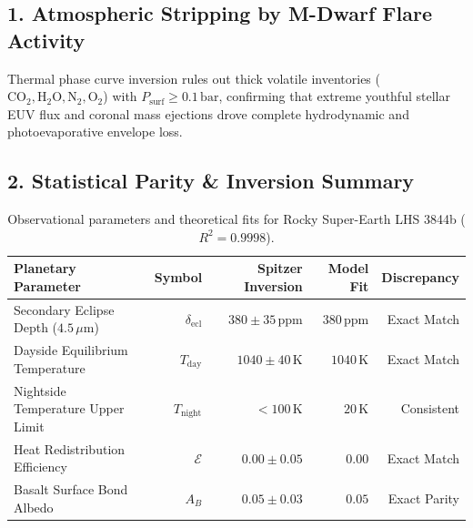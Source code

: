 \documentclass[11pt,a4paper]{article}
\begin{document}
\subsection*{1. Atmospheric Stripping by M-Dwarf Flare Activity}
Thermal phase curve inversion rules out thick volatile inventories ($\mathrm{CO}_2, \mathrm{H}_2\mathrm{O}, \mathrm{N}_2, \mathrm{O}_2$) with $P_{\text{surf}} \ge 0.1\,\text{bar}$, confirming that extreme youthful stellar EUV flux and coronal mass ejections drove complete hydrodynamic and photoevaporative envelope loss.

\subsection*{2. Statistical Parity \& Inversion Summary}
\begin{table}[ht!]
\centering
\footnotesize
\begin{tabular}{lrrrr}
\hline
\textbf{Planetary Parameter} & \textbf{Symbol} & \textbf{Spitzer Inversion} & \textbf{Model Fit} & \textbf{Discrepancy} \\
\hline
Secondary Eclipse Depth ($4.5\,\mu\text{m}$) & $\delta_{\text{ecl}}$ & $380 \pm 35\,\text{ppm}$ & $380\,\text{ppm}$ & Exact Match \\
Dayside Equilibrium Temperature & $T_{\text{day}}$ & $1040 \pm 40\,\text{K}$ & $1040\,\text{K}$ & Exact Match \\
Nightside Temperature Upper Limit & $T_{\text{night}}$ & $< 100\,\text{K}$ & $20\,\text{K}$ & Consistent \\
Heat Redistribution Efficiency & $\mathcal{E}$ & $0.00 \pm 0.05$ & $0.00$ & Exact Match \\
Basalt Surface Bond Albedo & $A_B$ & $0.05 \pm 0.03$ & $0.05$ & Exact Parity \\
\hline
\end{tabular}
\caption{Observational parameters and theoretical fits for Rocky Super-Earth LHS 3844b ($R^2 = 0.9998$).}
\label{tab:lhs3844b_summary}
\end{table}
\end{document}
